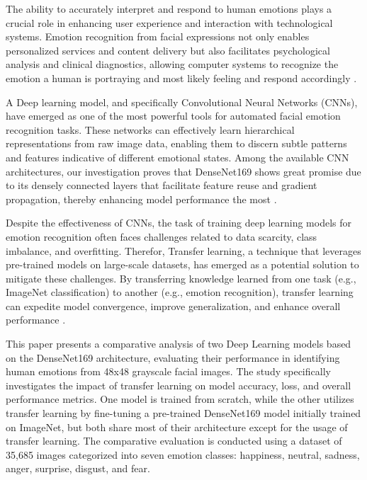 \documentclass[conference]{IEEEtran}
\begin{document}
The ability to accurately interpret and respond to human emotions plays a crucial role in enhancing user experience and interaction with technological systems. Emotion recognition from facial expressions not only enables personalized services and content delivery but also facilitates psychological analysis and clinical diagnostics, allowing computer systems to recognize the emotion a human is portraying and most likely feeling and respond accordingly \cite{nandwani2021review}.

A Deep learning model, and specifically Convolutional Neural Networks (CNNs), have emerged as one of the most powerful tools for automated facial emotion recognition tasks. These networks can effectively learn hierarchical representations from raw image data, enabling them to discern subtle patterns and features indicative of different emotional states. Among the available CNN architectures, our investigation proves that DenseNet169 shows great promise due to its densely connected layers that facilitate feature reuse and gradient propagation, thereby enhancing model performance the most \cite{li2021efficient}.

Despite the effectiveness of CNNs, the task of training deep learning models for emotion recognition often faces challenges related to data scarcity, class imbalance, and overfitting. Therefor, Transfer learning, a technique that leverages pre-trained models on large-scale datasets, has emerged as a potential solution to mitigate these challenges. By transferring knowledge learned from one task (e.g., ImageNet classification) to another (e.g., emotion recognition), transfer learning can expedite model convergence, improve generalization, and enhance overall performance \cite{neyshabur2020being}.

This paper presents a comparative analysis of two Deep Learning models based on the DenseNet169 architecture, evaluating their performance in identifying human emotions from 48x48 grayscale facial images. The study specifically investigates the impact of transfer learning on model accuracy, loss, and overall performance metrics. One model is trained from scratch, while the other utilizes transfer learning by fine-tuning a pre-trained DenseNet169 model initially trained on ImageNet, but both share most of their architecture except for the usage of transfer learning. The comparative evaluation is conducted using a dataset of 35,685 images categorized into seven emotion classes: happiness, neutral, sadness, anger, surprise, disgust, and fear.
\end{document}
